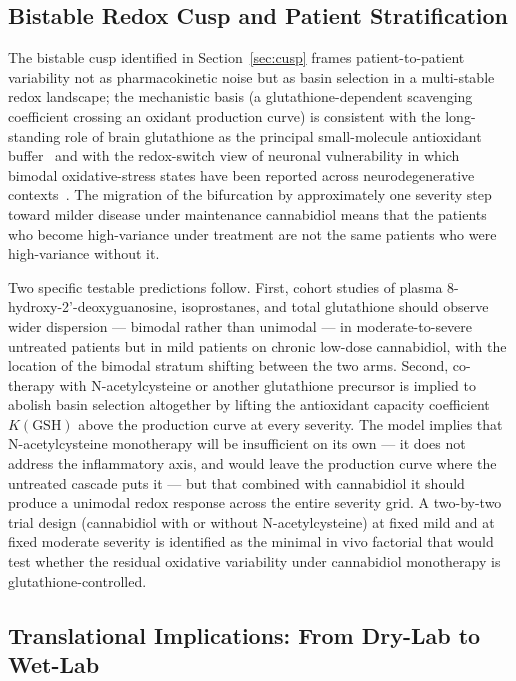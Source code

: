 \documentclass[10pt,letterpaper]{article}
\begin{document}
\subsection{Bistable Redox Cusp and Patient Stratification}
\label{sec:disc-cusp}

The bistable cusp identified in Section~\ref{sec:cusp} frames patient-to-patient variability not as pharmacokinetic noise but as basin selection in a multi-stable redox landscape; the mechanistic basis (a glutathione-dependent scavenging coefficient crossing an oxidant production curve) is consistent with the long-standing role of brain glutathione as the principal small-molecule antioxidant buffer~\cite{dringen2000} and with the redox-switch view of neuronal vulnerability in which bimodal oxidative-stress states have been reported across neurodegenerative contexts~\cite{smeyne2013,cassano2020,watt2017}. The migration of the bifurcation by approximately one severity step toward milder disease under maintenance cannabidiol means that the patients who become high-variance under treatment are not the same patients who were high-variance without it.

Two specific testable predictions follow. First, cohort studies of plasma 8-hydroxy-2'-deoxyguanosine, isoprostanes, and total glutathione should observe wider dispersion --- bimodal rather than unimodal --- in moderate-to-severe untreated patients but in mild patients on chronic low-dose cannabidiol, with the location of the bimodal stratum shifting between the two arms. Second, co-therapy with N-acetylcysteine or another glutathione precursor is implied to abolish basin selection altogether by lifting the antioxidant capacity coefficient $K(\text{GSH})$ above the production curve at every severity. The model implies that N-acetylcysteine monotherapy will be insufficient on its own --- it does not address the inflammatory axis, and would leave the production curve where the untreated cascade puts it --- but that combined with cannabidiol it should produce a unimodal redox response across the entire severity grid. A two-by-two trial design (cannabidiol with or without N-acetylcysteine) at fixed mild and at fixed moderate severity is identified as the minimal in vivo factorial that would test whether the residual oxidative variability under cannabidiol monotherapy is glutathione-controlled.

\subsection{Translational Implications: From Dry-Lab to Wet-Lab}
\label{sec:disc-translational}
\end{document}
